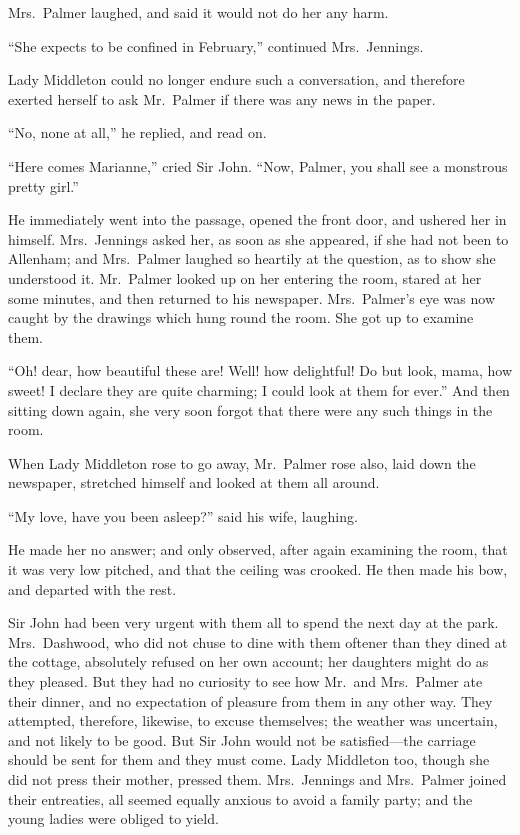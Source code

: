 \documentclass{article}
\begin{document}
Mrs.\ Palmer laughed, and said it would not do her
any harm.

``She expects to be confined in February,''
continued Mrs.\ Jennings.

Lady Middleton could no longer endure such a conversation,
and therefore exerted herself to ask Mr.\ Palmer if there
was any news in the paper.

``No, none at all,'' he replied, and read on.

``Here comes Marianne,'' cried Sir John.  ``Now, Palmer,
you shall see a monstrous pretty girl.''

He immediately went into the passage, opened the front door,
and ushered her in himself.  Mrs.\ Jennings asked her,
as soon as she appeared, if she had not been to Allenham;
and Mrs.\ Palmer laughed so heartily at the question,
as to show she understood it.  Mr.\ Palmer looked up
on her entering the room, stared at her some minutes,
and then returned to his newspaper.  Mrs.\ Palmer's eye
was now caught by the drawings which hung round the room.
She got up to examine them.

``Oh! dear, how beautiful these are!  Well! how delightful!
Do but look, mama, how sweet! I declare they are quite charming;
I could look at them for ever.'' And then sitting down again,
she very soon forgot that there were any such things in the room.

When Lady Middleton rose to go away, Mr.\ Palmer
rose also, laid down the newspaper, stretched himself
and looked at them all around.

``My love, have you been asleep?'' said his wife, laughing.

He made her no answer; and only observed, after again
examining the room, that it was very low pitched,
and that the ceiling was crooked.  He then made his bow,
and departed with the rest.

Sir John had been very urgent with them all to
spend the next day at the park.  Mrs.\ Dashwood, who did
not chuse to dine with them oftener than they dined
at the cottage, absolutely refused on her own account;
her daughters might do as they pleased.  But they had no
curiosity to see how Mr.\ and Mrs.\ Palmer ate their dinner,
and no expectation of pleasure from them in any other way.
They attempted, therefore, likewise, to excuse themselves;
the weather was uncertain, and not likely to be good.
But Sir John would not be satisfied---the carriage should
be sent for them and they must come.  Lady Middleton too,
though she did not press their mother, pressed them.
Mrs.\ Jennings and Mrs.\ Palmer joined their entreaties, all
seemed equally anxious to avoid a family party; and the young
ladies were obliged to yield.
\end{document}
